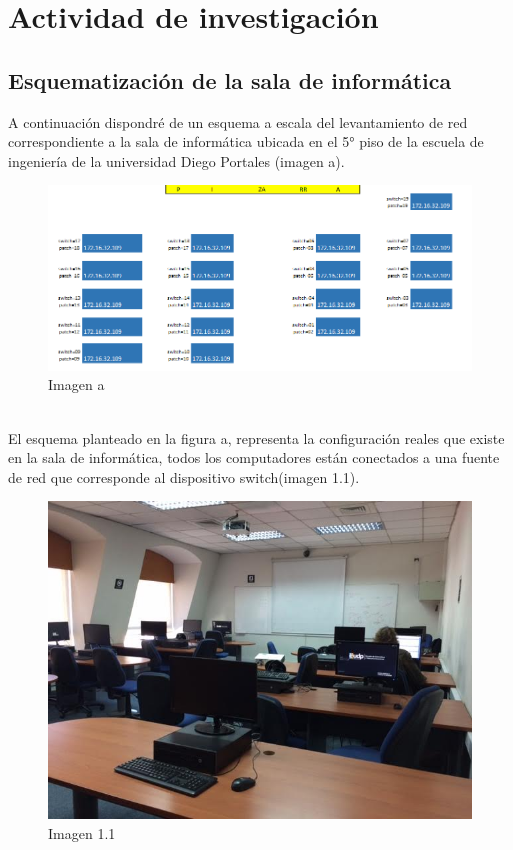 \documentclass[spanish]{udpreport}
\begin{document}
\chapter{Actividad de investigación}
\section{Esquematización de  la sala de informática}
A continuación dispondré de un esquema a escala del levantamiento de red correspondiente a la sala de informática ubicada en el 5° piso de la escuela de ingeniería de la universidad Diego Portales (imagen a).
\\[0.2cm]
\begin{figure}[h]
    \centering
    \includegraphics[scale=0.5]{images/SalaInformatica.png}
    \caption{Imagen a}
    \label{fig:my_label}
\end{figure}
\\
El esquema planteado en la figura a, representa  la configuración reales que existe en la sala de informática, todos los computadores están conectados a una fuente de red que corresponde al dispositivo switch(imagen 1.1).
\begin{figure}
    \centering
    \includegraphics[scale=0.3]{images/apa.jpg}
    \caption{Imagen 1.1}
    \label{fig:my_label}
\end{figure}
\newpage
\end{document}
